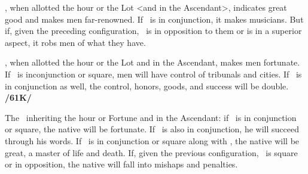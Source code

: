 \Venus, when allotted the hour or the Lot <and in the Ascendant>, indicates great good and makes men far-renowned. If \Mercury\, is in conjunction, it makes musicians. But if, given the preceding configuration, \Saturn\, is in opposition to them or is in a superior aspect, it robs men of what they have.

\Mercury, when allotted the hour or the Lot and in the Ascendant, makes men fortunate. If \Jupiter\, is inconjunction or square, men will have control of tribunals and cities. If \Saturn\, is in conjunction as well, the control, honors, goods, and success will be double. \textbf{/61K/}

The \Sun\, inheriting the hour or Fortune and in the Ascendant: if \Jupiter\, is in conjunction or square, the native will be fortunate. If \Mercury\, is also in conjunction, he will succeed through his words. If \Mars\, is in conjunction or square along with \Jupiter, the native will be great, a master of life and death. If, given the previous configuration, \Saturn\, is square or in opposition, the native will fall into mishaps and penalties.

